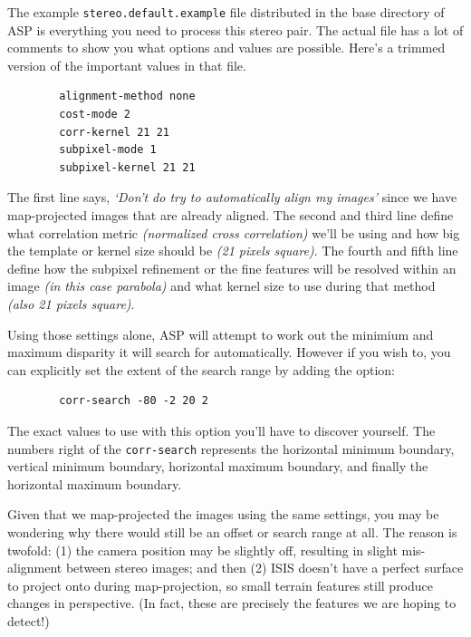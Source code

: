 The example \texttt{stereo.default.example} file distributed in the
base directory of \ac{ASP} is everything you need to process this
stereo pair. The actual file has a lot of comments to show you what
options and values are possible. Here's a trimmed version of the
important values in that file.
\begin{verbatim}
        alignment-method none
        cost-mode 2
        corr-kernel 21 21
        subpixel-mode 1
        subpixel-kernel 21 21
\end{verbatim}

The first line says, \emph{`Don't do try to automatically align my
  images'} since we have map-projected images that are already
aligned. The second and third line define what correlation metric
\textit{(normalized cross correlation)} we'll be using and how big the
template or kernel size should be \textit{(21 pixels square)}. The
fourth and fifth line define how the subpixel refinement or the fine
features will be resolved within an image \textit{(in this case
  parabola)} and what kernel size to use during that method
\textit{(also 21 pixels square)}.

Using those settings alone, \ac{ASP} will attempt to work out the
minimium and maximum disparity it will search for automatically. However if you
wish to, you can explicitly set the extent of the search range by
adding the option:
\begin{verbatim}
        corr-search -80 -2 20 2
\end{verbatim}

The exact values to use with this option you'll have to discover
yourself. The numbers right of the \texttt{corr-search} represents the
horizontal minimum boundary, vertical minimum boundary, horizontal
maximum boundary, and finally the horizontal maximum boundary.

Given that we map-projected the images using the same settings, you
may be wondering why there would still be an offset or search range at
all. The reason is twofold: (1) the camera position may be slightly
off, resulting in slight mis-alignment between stereo images; and then (2)
\ac{ISIS} doesn't have a perfect surface to project onto during map-projection, so small terrain features still produce changes in
perspective.  (In fact, these are precisely the features we are hoping
to detect!)

